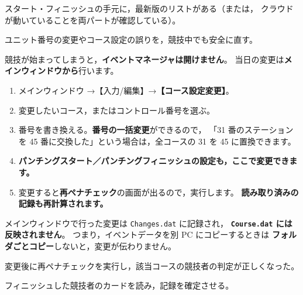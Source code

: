 \begin{Done}
スタート・フィニッシュの手元に，最新版のリストがある（または，
クラウドが動いていることを両パートが確認している）。
\end{Done}


\begin{Goal}
ユニット番号の変更やコース設定の誤りを，競技中でも安全に直す。
\end{Goal}

競技が始まってしまうと，\textbf{イベントマネージャは開けません}。
当日の変更は\textbf{メインウィンドウから}行います。

\begin{enumerate}
\item メインウィンドウ →【入力/編集】→\textbf{【コース設定変更】}。\ver
\item 変更したいコース，またはコントロール番号を選ぶ。
\item 番号を書き換える。\textbf{番号の一括変更}ができるので，
      「31 番のステーションを 45 番に交換した」という場合は，全コースの 31 を 45 に置換できます。
\item \textbf{パンチングスタート／パンチングフィニッシュの設定も，ここで変更できます。}
\item 変更すると\textbf{再ペナチェック}の画面が出るので，実行します。
      \textbf{読み取り済みの記録も再計算されます。}
\end{enumerate}

\begin{Note}[この変更はどこに残るか]
メインウィンドウで行った変更は \texttt{Changes.dat} に記録され，
\textbf{\texttt{Course.dat} には反映されません}。
つまり，イベントデータを別 PC にコピーするときは
\textbf{フォルダごとコピー}しないと，変更が伝わりません。
\end{Note}

\begin{Done}
変更後に再ペナチェックを実行し，該当コースの競技者の判定が正しくなった。
\end{Done}


\begin{Goal}
フィニッシュした競技者のカードを読み，記録を確定させる。
\end{Goal}

